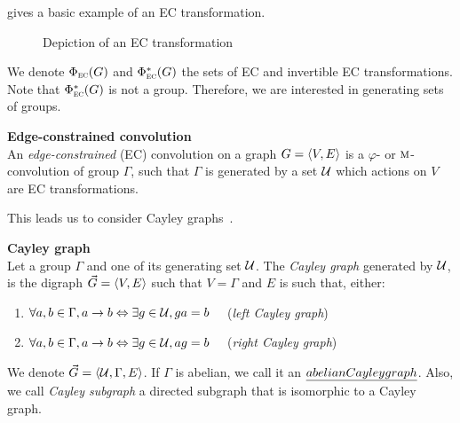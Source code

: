  gives a basic example of an EC transformation.

\begin{figure}[h!t]
    \begin{center}
    \end{center}
    \caption{Depiction of an EC transformation}
    \label{fig:ec}
  \end{figure}

We denote $\Phi_{\operatorname{\textsc{ec}}}(G)$ and $\Phi^*_{\operatorname{\textsc{ec}}}(G)$ the sets of EC and invertible EC transformations. Note that $\Phi^*_{\operatorname{\textsc{ec}}}(G)$ is not a group. Therefore, we are interested in generating sets of groups.

\begin{definition}\textbf{Edge-constrained convolution}\\
An \emph{edge-constrained} (EC) convolution on a graph $G = \langle V, E \rangle$ is a $\varphi$- or $\operatorname{\textsc{m}}$-convolution of group $\Gamma$, such that $\Gamma$ is generated by a set $\mathcal{U}$ which actions on $V$ are EC transformations.
\end{definition}

This leads us to consider Cayley graphs~\citep{cayley1878desiderata}.%

\begin{definition}\textbf{Cayley graph}\\
Let a group $\Gamma$ and one of its generating set $\mathcal{U}$. The \emph{Cayley graph} generated by $\mathcal{U}$, is the digraph $\vec{G} = \langle V, E \rangle$ such that $V = \Gamma$ and $E$ is such that, either:
\begin{enumerate}[nolistsep,noitemsep,label=(\roman*)]
\item $\forall a,b \in \Gamma, a \rightarrow b \Leftrightarrow \exists g \in \mathcal{U}, ga = b \quad$ (\emph{left Cayley graph})
\item $\forall a,b \in \Gamma, a \rightarrow b \Leftrightarrow \exists g \in \mathcal{U}, ag = b \quad$ (\emph{right Cayley graph})
\end{enumerate}
We denote $\vec{G} = \langle \mathcal{U}, \Gamma, E \rangle$. If $\Gamma$ is abelian, we call it an $\emph{abelian Cayley graph}$.
Also, we call \emph{Cayley subgraph} a directed subgraph that is isomorphic to a Cayley graph.
\end{definition}

